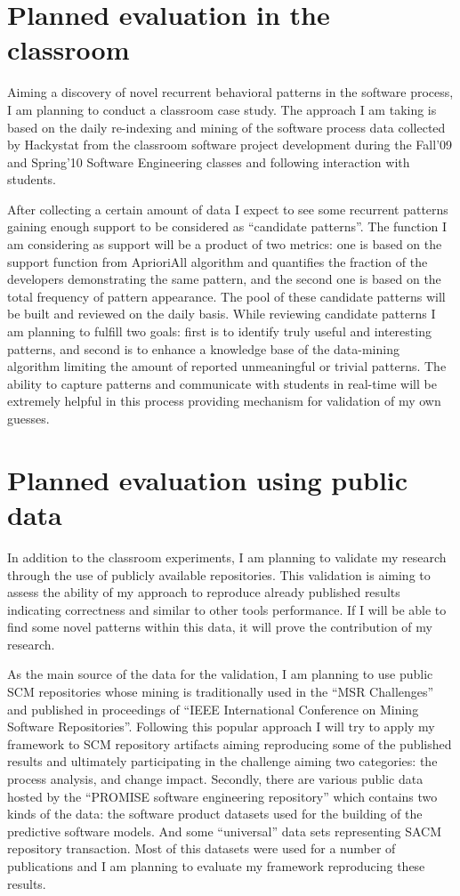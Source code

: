 \section{Planned evaluation in the classroom}
Aiming a discovery of novel recurrent behavioral patterns in the software process, I am planning to conduct a classroom case study. The approach I am taking is based on the daily re-indexing and mining of the software process data collected by Hackystat from the classroom software project development during the Fall'09 and Spring'10 Software Engineering classes and following interaction with students. 

After collecting a certain amount of data I expect to see some recurrent patterns gaining enough support to be considered as ``candidate patterns''. The function I am considering as support will be a product of two metrics: one is based on the support function from AprioriAll algorithm and quantifies the fraction of the developers demonstrating the same pattern, and the second one is based on the total frequency of pattern appearance. The pool of these candidate patterns will be built and reviewed on the daily basis. While reviewing candidate patterns I am planning to fulfill two goals: first is to identify truly useful and interesting patterns, and second is to enhance a knowledge base of the data-mining algorithm limiting the amount of reported unmeaningful or trivial patterns. The ability to capture patterns and communicate with students in real-time will be extremely helpful in this process providing mechanism for validation of my own guesses.


\section{Planned evaluation using public data}
In addition to the classroom experiments, I am planning to validate my research through the use of publicly available repositories. This validation is aiming to assess the ability of my approach to reproduce already published results indicating correctness and similar to other tools performance. If I will be able to find some novel patterns within this data, it will prove the contribution of my research.

As the main source of the data for the validation, I am planning to use public SCM repositories whose mining is traditionally used in the ``MSR Challenges'' \cite{citeulike:5043676} and published in proceedings of ``IEEE International Conference on Mining Software Repositories''. Following this popular approach I will try to apply my framework to SCM repository artifacts aiming reproducing some of the published results and ultimately participating in the challenge aiming two categories: the process analysis, and change impact. Secondly, there are various public data hosted by the ``PROMISE software engineering repository'' \cite{Sayyad:2005} which contains two kinds of the data: the software product datasets used for the building of the predictive software models. And some ``universal'' data sets representing SACM repository transaction. Most of this datasets were used for a number of publications and I am planning to evaluate my framework reproducing these results. 